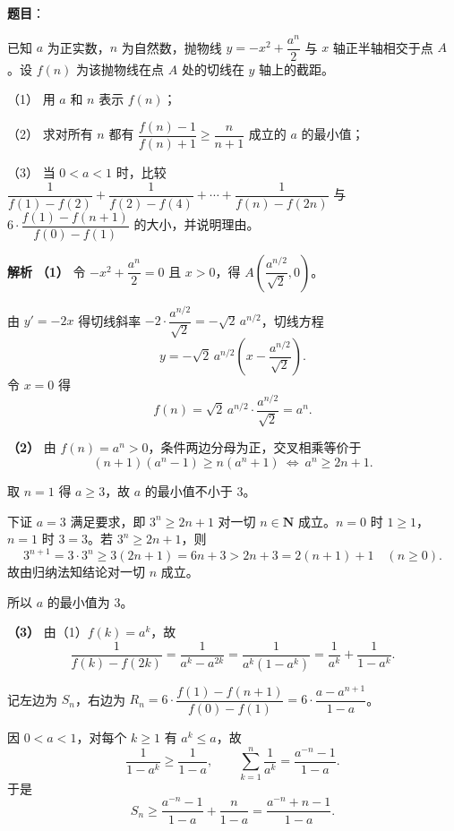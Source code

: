 \begin{answer}

\textbf{题目}：

已知 $a$ 为正实数，$n$ 为自然数，抛物线 $y=-x^2+\dfrac{a^n}2$ 与 $x$ 轴正半轴相交于点 $A$。设 $f(n)$ 为该抛物线在点 $A$ 处的切线在 $y$ 轴上的截距。

（1） 用 $a$ 和 $n$ 表示 $f(n)$；

（2） 求对所有 $n$ 都有 $\dfrac{f(n)-1}{f(n)+1}\geqslant\dfrac{n}{n+1}$ 成立的 $a$ 的最小值；

（3） 当 $0<a<1$ 时，比较 $\dfrac1{f(1)-f(2)}+\dfrac1{f(2)-f(4)}+\cdots+\dfrac1{f(n)-f(2n)}$ 与 $6\cdot\dfrac{f(1)-f(n+1)}{f(0)-f(1)}$ 的大小，并说明理由。

\textbf{解析}
\textbf{（1）} 令 $-x^2+\dfrac{a^n}2=0$ 且 $x>0$，得 $A\left(\dfrac{a^{n/2}}{\sqrt2},0\right)$。

由 $y'=-2x$ 得切线斜率 $-2\cdot\dfrac{a^{n/2}}{\sqrt2}=-\sqrt2\,a^{n/2}$，切线方程
\nopagebreak[4]
\[y=-\sqrt2\,a^{n/2}\left(x-\frac{a^{n/2}}{\sqrt2}\right).\]
令 $x=0$ 得
\nopagebreak[4]
\[f(n)=\sqrt2\,a^{n/2}\cdot\frac{a^{n/2}}{\sqrt2}=a^n.\]

\textbf{（2）} 由 $f(n)=a^n>0$，条件两边分母为正，交叉相乘等价于
\nopagebreak[4]
\[(n+1)\left(a^n-1\right)\geqslant n\left(a^n+1\right)\ \Longleftrightarrow\ a^n\geqslant2n+1.\]

取 $n=1$ 得 $a\geqslant3$，故 $a$ 的最小值不小于 $3$。

下证 $a=3$ 满足要求，即 $3^n\geqslant2n+1$ 对一切 $n\in\mathbf N$ 成立。$n=0$ 时 $1\geqslant1$，$n=1$ 时 $3=3$。若 $3^n\geqslant2n+1$，则
\nopagebreak[4]
\[3^{n+1}=3\cdot3^n\geqslant3(2n+1)=6n+3>2n+3=2(n+1)+1\quad(n\geqslant0).\]
故由归纳法知结论对一切 $n$ 成立。

所以 $a$ 的最小值为 $3$。

\textbf{（3）} 由（1）$f(k)=a^k$，故
\nopagebreak[4]
\[\frac1{f(k)-f(2k)}=\frac1{a^k-a^{2k}}=\frac1{a^k\left(1-a^k\right)}=\frac1{a^k}+\frac1{1-a^k}.\]

记左边为 $S_n$，右边为 $R_n=6\cdot\dfrac{f(1)-f(n+1)}{f(0)-f(1)}=6\cdot\dfrac{a-a^{n+1}}{1-a}$。

因 $0<a<1$，对每个 $k\geqslant1$ 有 $a^k\leqslant a$，故
\nopagebreak[4]
\[\frac1{1-a^k}\geqslant\frac1{1-a},\qquad \sum_{k=1}^n\frac1{a^k}=\frac{a^{-n}-1}{1-a}.\]
于是
\nopagebreak[4]
\[S_n\geqslant\frac{a^{-n}-1}{1-a}+\frac{n}{1-a}=\frac{a^{-n}+n-1}{1-a}.\]


\end{answer}
